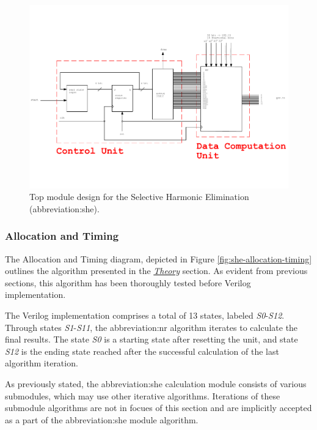 \documentclass[a4paper, twoside, 11pt]{article}
\begin{document}
            \begin{figure}[htbp!]
                \centering
                \includegraphics[width=1\textwidth]{src/pdf/she-top-module.pdf}
                           \caption{Top module design for the Selective Harmonic Elimination (\gls{abbreviation:she}).}
                \label{fig:she-top-module}
            \end{figure}

    \FloatBarrier
        \subsubsection{Allocation and Timing}\label{subsubsec:she-allocation-and-timing}
            The Allocation and Timing diagram, depicted in Figure \ref{fig:she-allocation-timing} outlines the algorithm presented in the \hyperref[subsec:she-theory]{\textit{Theory}} section. As evident from previous sections, this algorithm has been thoroughly tested before Verilog implementation.\par
            The Verilog implementation comprises a total of 13 states, labeled \textit{S0}-\textit{S12}. Through states \textit{S1}-\textit{S11}, the \gls{abbreviation:nr} algorithm iterates to calculate the final results. The state \textit{S0} is a starting state after resetting the unit, and state \textit{S12} is the ending state reached after the successful calculation of the last algorithm iteration.\par
            As previously stated, the \gls{abbreviation:she} calculation module consists of various submodules, which may use other iterative algorithms. Iterations of these submodule algorithms are not in focues of this section and are implicitly accepted as a part of the \gls{abbreviation:she} module algorithm.
\end{document}
